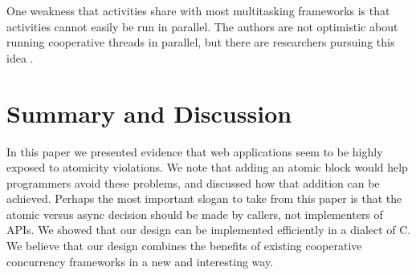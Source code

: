 \documentclass[acmsmall,anonymous,review]{acmart}\settopmatter{printfolios=true,printccs=false,printacmref=false}
\begin{document}
One weakness that activities share with most multitasking frameworks is that activities cannot easily be run in parallel.
The authors are not optimistic about running cooperative threads in parallel, but there are researchers pursuing this idea \cite{ONeill2015, Boussinot2006, Dabrowski2006}.







\section{Summary and Discussion}

In this paper we presented evidence that web applications seem to be highly exposed to atomicity violations.
We note that adding an atomic block would help programmers avoid these problems, and discussed how that addition can be achieved.
Perhaps the most important slogan to take from this paper is that the atomic versus async decision should be made by callers, not implementers of APIs.
We showed that our design can be implemented efficiently in a dialect of C.
We believe that our design combines the benefits of existing cooperative concurrency frameworks in a new and interesting way.
\end{document}
